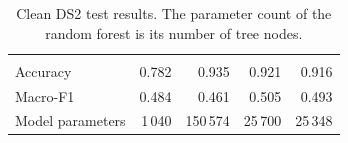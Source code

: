 \begin{table}[H]
  \centering
  \caption{Clean DS2 test results. The parameter count of the random forest is its number of tree nodes.}
  \label{tab:clean-results}
  \begin{tabularx}{\linewidth}{lRRRR}
     &  &  &  &  \\
    Accuracy & 0.782 & 0.935 & 0.921 & 0.916 \\
    Macro-F1 & 0.484 & 0.461 & 0.505 & 0.493 \\
    Model parameters & 1\,040 & 150\,574 & 25\,700 & 25\,348 \\
    \bottomrule
  \end{tabularx}
\end{table}
